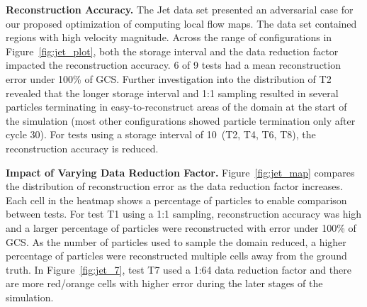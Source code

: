 


\textbf{Reconstruction Accuracy.} The Jet data set presented an adversarial case for our proposed optimization of computing local flow maps.
%
The data set contained regions with high velocity magnitude.
%
Across the range of configurations in Figure~\ref{fig:jet_plot}, both the storage interval and the data reduction factor impacted the reconstruction accuracy.
%
6 of 9 tests had a mean reconstruction error under 100\% of GCS. 
%
Further investigation into the distribution of T2 revealed that the longer storage interval and 1:1 sampling resulted in several particles terminating in easy-to-reconstruct areas of the domain at the start of the simulation (most other configurations showed particle termination only after cycle 30).
%
For tests using a storage interval of 10~(T2, T4, T6, T8), the reconstruction accuracy is reduced.
%
%
%
%
%

\textbf{Impact of Varying Data Reduction Factor.} Figure~\ref{fig:jet_map} compares the distribution of reconstruction error as the data reduction factor increases. 
%
Each cell in the heatmap shows a percentage of particles to enable comparison between tests.
%
For test T1 using a 1:1 sampling, reconstruction accuracy was high and a larger percentage of particles were reconstructed with error under 100\% of GCS.
%
As the number of particles used to sample the domain reduced, a higher percentage of particles were reconstructed multiple cells away from the ground truth. 
%
In Figure~\ref{fig:jet_7}, test T7 used a 1:64 data reduction factor and there are more red/orange cells with higher error during the later stages of the simulation. 
%
%
%
%
%

